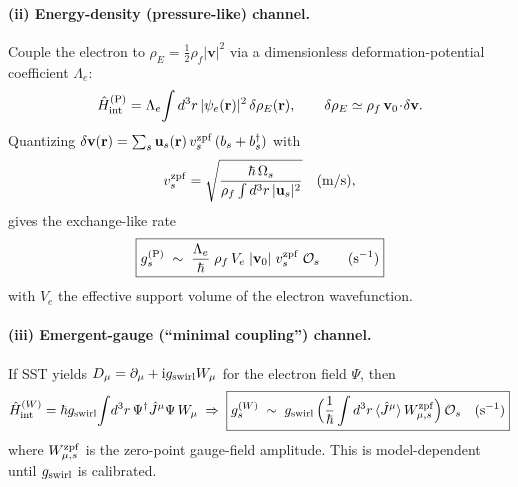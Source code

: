 \documentclass[aps,prb,preprint,amsmath,amssymb]{revtex4-2} %
\newcommand{\rhoF}{\rho_{f}}
\newcommand{\rhoE}{\rho_{E}}
\begin{document}
        \paragraph*{(ii) Energy-density (pressure-like) channel.}
            Couple the electron to \(\rhoE=\tfrac12\rhoF|\mathbf v|^2\) via a dimensionless deformation-potential coefficient \(\Lambda_e\):
            \begin{align}
                \hat H_{\rm int}^{(\mathrm P)}=\Lambda_e\!\int d^3r\,|\psi_e(\mathbf r)|^2\,\delta\rhoE(\mathbf r),
                \qquad
                \delta\rhoE\simeq \rhoF\,\mathbf v_0\!\cdot\!\delta\mathbf v .
            \end{align}
            Quantizing \(\delta\mathbf v(\mathbf r)=\sum_s \mathbf u_s(\mathbf r)\,v_{s}^{\rm zpf}\,(b_s+b_s^\dagger)\) with
            \begin{align}
                v_{s}^{\rm zpf}
                = \sqrt{\frac{\hbar\,\Omega_s}{\rhoF\int d^3r\,|\mathbf u_s|^2}}\quad(\mathrm{m/s}),
            \end{align}
            gives the exchange-like rate
            \begin{align}
                \boxed{%
                    g_s^{(\mathrm P)} \;\sim\; \frac{\Lambda_e}{\hbar}\;\rhoF\,V_e\;|\mathbf v_0|\;v_{s}^{\rm zpf}\;\mathcal O_s \qquad (\mathrm{s^{-1}})
                }\label{eq:gP}
            \end{align}
            with \(V_e\) the effective support volume of the electron wavefunction.

        \paragraph*{(iii) Emergent-gauge (“minimal coupling”) channel.}
            If SST yields \(D_\mu=\partial_\mu+\mathrm{i} g_{\rm swirl} W_\mu\) for the electron field \(\Psi\), then
            \begin{align}
                \hat H_{\rm int}^{(W)}=\hbar g_{\rm swirl}\!\int\! d^3r\,\Psi^\dagger \hat J^\mu \Psi\, W_\mu
                \;\Rightarrow\;
                \boxed{%
                    g_s^{(W)} \;\sim\; g_{\rm swirl}\,\Big(\frac{1}{\hbar}\int d^3r\,\langle \hat J^\mu\rangle\,W^{\rm zpf}_{\mu,s}\Big)\,\mathcal O_s \quad (\mathrm{s^{-1}})
                }\label{eq:gW}
            \end{align}
            where \(W^{\rm zpf}_{\mu,s}\) is the zero-point gauge-field amplitude. This is model-dependent until \(g_{\rm swirl}\) is calibrated.
\end{document}
